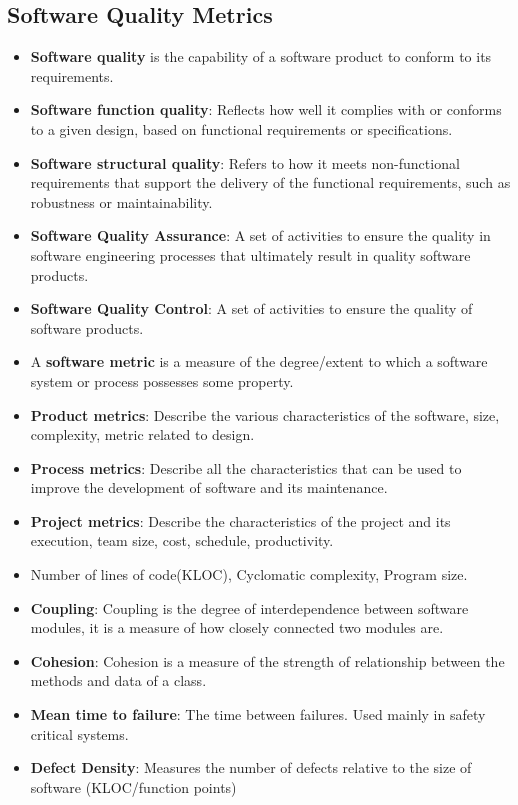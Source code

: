 \documentclass[a4paper]{article}
\begin{document}
\subsection{Software Quality Metrics}
\begin{itemize}
    \item \textbf{Software quality} is the capability of a software product to conform to its requirements.
    \item \textbf{Software function quality}: Reflects how well it complies with or conforms to a given design, based on functional requirements or specifications.
    \item \textbf{Software structural quality}: Refers to how it meets non-functional requirements that support the delivery of the functional requirements, such as robustness or maintainability.
    \item \textbf{Software Quality Assurance}: A set of activities to ensure the quality in software engineering processes that ultimately result in quality software products.
    \item \textbf{Software Quality Control}: A set of activities to ensure the quality of software products.
    \item A \textbf{software metric} is a measure of the degree/extent to which a software system or process possesses some property.
    \item \textbf{Product metrics}: Describe the various characteristics of the software, size, complexity, metric related to design.
    \item \textbf{Process metrics}: Describe all the characteristics that can be used to improve the development of software and its maintenance.
    \item \textbf{Project metrics}: Describe the characteristics of the project and its execution, team size, cost, schedule, productivity.
    \item Number of lines of code(KLOC), Cyclomatic complexity, Program size.
    \item \textbf{Coupling}: Coupling is the degree of interdependence between software modules, it is a measure of how closely connected two modules are.
    \item \textbf{Cohesion}: Cohesion is a measure of the strength of relationship between the methods and data of a class.
    \item \textbf{Mean time to failure}: The time between failures. Used mainly in safety critical systems.
    \item \textbf{Defect Density}: Measures the number of defects relative to the size of software (KLOC/function points)

\end{itemize}
\end{document}

